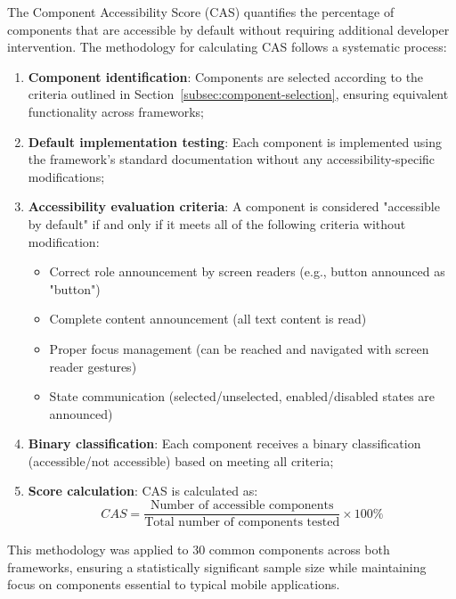The Component Accessibility Score (CAS) quantifies the percentage of components that are accessible by default without requiring additional developer intervention. The methodology for calculating CAS follows a systematic process:

\begin{enumerate}
    \item \textbf{Component identification}: Components are selected according to the criteria outlined in Section~\ref{subsec:component-selection}, ensuring equivalent functionality across frameworks;
    
    \item \textbf{Default implementation testing}: Each component is implemented using the framework's standard documentation without any accessibility-specific modifications;
    
    \item \textbf{Accessibility evaluation criteria}: A component is considered "accessible by default" if and only if it meets all of the following criteria without modification:
    \begin{itemize}
        \item Correct role announcement by screen readers (e.g., button announced as "button")
        \item Complete content announcement (all text content is read)
        \item Proper focus management (can be reached and navigated with screen reader gestures)
        \item State communication (selected/unselected, enabled/disabled states are announced)
    \end{itemize}
    
    \item \textbf{Binary classification}: Each component receives a binary classification (accessible/not accessible) based on meeting all criteria;
    
    \item \textbf{Score calculation}: CAS is calculated as:
    \begin{equation}
    CAS = \frac{\text{Number of accessible components}}{\text{Total number of components tested}} \times 100\%
    \end{equation}
\end{enumerate}

This methodology was applied to 30 common components across both frameworks, ensuring a statistically significant sample size while maintaining focus on components essential to typical mobile applications.

